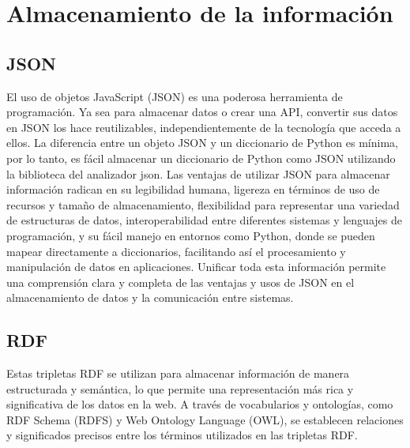 \section{Almacenamiento de la información}	
\subsection{JSON}
El uso de objetos JavaScript (JSON) es una poderosa herramienta de programación. Ya sea para almacenar datos o crear una API, convertir sus datos en JSON los hace reutilizables, independientemente de la tecnología que acceda a ellos. La diferencia entre un objeto JSON y un diccionario de Python es mínima, por lo tanto, es fácil almacenar un diccionario de Python como JSON utilizando la biblioteca del analizador json. Las ventajas de utilizar JSON para almacenar información radican en su legibilidad humana, ligereza en términos de uso de recursos y tamaño de almacenamiento, flexibilidad para representar una variedad de estructuras de datos, interoperabilidad entre diferentes sistemas y lenguajes de programación, y su fácil manejo en entornos como Python, donde se pueden mapear directamente a diccionarios, facilitando así el procesamiento y manipulación de datos en aplicaciones. Unificar toda esta información permite una comprensión clara y completa de las ventajas y usos de JSON en el almacenamiento de datos y la comunicación entre sistemas.

\subsection{RDF}


Estas tripletas RDF se utilizan para almacenar información de manera estructurada y semántica, lo que permite una representación más rica y significativa de los datos en la web. A través de vocabularios y ontologías, como RDF Schema (RDFS) y Web Ontology Language (OWL), se establecen relaciones y significados precisos entre los términos utilizados en las tripletas RDF.


